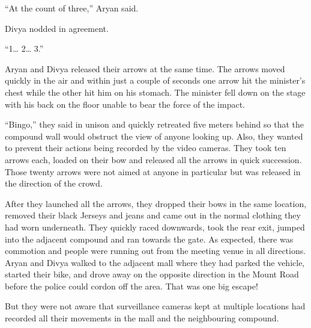 “At the count of three,” Aryan said.

Divya nodded in agreement.

“1… 2… 3.”

Aryan and Divya released their arrows at the same time. The arrows moved quickly
in the air and within just a couple of seconds one arrow hit the minister's
chest while the other hit him on his stomach. The minister fell down on the
stage with his back on the floor unable to bear the force of the impact.

“Bingo,” they said in unison and quickly retreated five meters behind so that
the compound wall would obstruct the view of anyone looking up. Also, they
wanted to prevent their actions being recorded by the video cameras. They took
ten arrows each, loaded on their bow and released all the arrows in quick
succession. Those twenty arrows were not aimed at anyone in particular but was
released in the direction of the crowd.

After they launched all the arrows, they dropped their bows in the same
location, removed their black Jerseys and jeans and came out in the normal
clothing they had worn underneath. They quickly raced downwards, took the rear
exit, jumped into the adjacent compound and ran towards the gate. As expected,
there was commotion and people were running out from the meeting venue in all
directions. Aryan and Divya walked to the adjacent mall where they had parked
the vehicle, started their bike, and drove away on the opposite direction in the
Mount Road before the police could cordon off the area. That was one big escape!

But they were not aware that surveillance cameras kept at multiple locations had
recorded all their movements in the mall and the neighbouring compound.